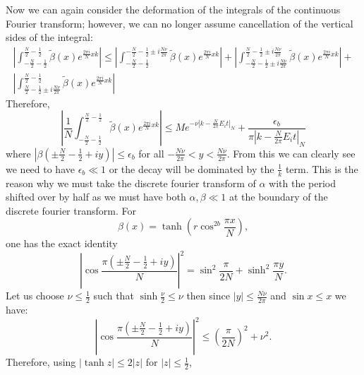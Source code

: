 Now we can again consider the deformation of the integrals of the continuous Fourier transform; however, we can no longer assume cancellation of the vertical sides of the integral:
\begin{multline}
     \left|\int_{-\frac{N}{2}-\frac{1}{2}}^{\frac{N}{2}-\frac{1}{2}}\tilde\beta(x)e^{\frac{2\pi i}{N}xk}\right| \leq \left|\int_{-\frac{N}{2}-\frac{1}{2}}^{-\frac{N}{2}-\frac{1}{2}\pm i\frac{N\nu}{2\pi}}\tilde\beta(x)e^{\frac{2\pi i}{N}xk}\right|+\left|\int_{-\frac{N}{2}-\frac{1}{2}\pm i\frac{N\nu}{2\pi}}^{\frac{N}{2}-\frac{1}{2}\pm i\frac{N\nu}{2\pi}}\tilde\beta(x)e^{\frac{2\pi i}{N}xk}\right|+\\\left|\int_{\frac{N}{2}-\frac{1}{2}\pm i \frac{N\nu}{2\pi}}^{\frac{N}{2}-\frac{1}{2}}\tilde\beta(x)e^{\frac{2\pi i}{N}xk}\right|
\end{multline}
Therefore,
\begin{equation}
    \left|\frac{1}{N}\int_{-\frac{N}{2}-\frac{1}{2}}^{\frac{N}{2}-\frac{1}{2}}\tilde\beta(x)e^{\frac{2\pi i}{N}xk}\right| \leq Me^{-\nu|k-\frac{N}{2\pi}E_i t|_{N}} + \frac{\epsilon_b}{\pi|k-\frac{N}{2\pi}E_i t|_{N}}
    \label{eq:noninteger3}
\end{equation}
where $|\beta(\pm\frac{N}{2}-\frac{1}{2}+iy)| \leq\epsilon_b$ for all $-\frac{N\nu}{2\pi}<y<\frac{N\nu}{2\pi}$. From this we can clearly see we need to have $\epsilon_b \ll 1$ or the decay will be dominated by the $\frac{1}{k}$ term. This is the reason why we must take the discrete fourier transform of $\alpha$ with the period shifted over by half as we must have both $\alpha, \beta \ll 1$ at the boundary of the discrete fourier transform. For
\begin{equation}
\beta(x)=\tanh\!\left(r\cos^{2b}\frac{\pi x}{N}\right),
\label{eq:betadefinitionvertical}
\end{equation}
one has the exact identity
\begin{equation}
\left|
\cos\frac{\pi\left(\pm\frac{N}{2}-\frac12+iy\right)}{N}
\right|^2
=
\sin^2\frac{\pi}{2N}
+\sinh^2\frac{\pi y}{N}.
\label{eq:verticalcosineidentity}
\end{equation}
Let us choose $\nu \leq \frac{1}{2}$ such that $\sinh \frac{\nu}{2} \leq \nu$ then since $|y|\leq\frac{N\nu}{2\pi}$ and $\sin x\leq x$ we have:
\begin{equation}
\left|
\cos\frac{\pi\left(\pm\frac{N}{2}-\frac12+iy\right)}{N}
\right|^2
\leq
\left(\frac{\pi}{2N}\right)^2+\nu^2.
\label{eq:verticalcosinebound}
\end{equation}
Therefore, using $|\tanh z|\leq2|z|$ for $|z|\leq\frac12$,
